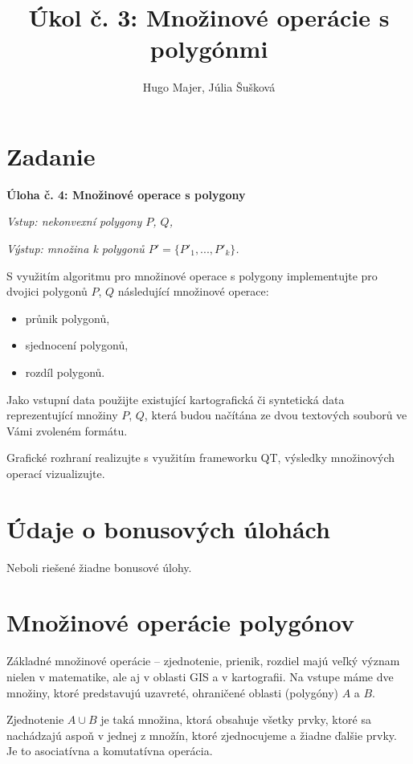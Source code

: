 \documentclass[11pt]{article}
\title{\textbf{Úkol č. 3: Množinové operácie s polygónmi}}
\author{Hugo Majer, Júlia Šušková}
\begin{document}
\maketitle

\newpage
{}
\section{Zadanie}
\textbf{Úloha č. 4: Množinové operace s polygony}

\textit{Vstup: nekonvexní polygony $P$, $Q$,}

\textit{Výstup: množina k polygonů $P'=\{P'_1, ..., P'_k\}$.}

S využitím algoritmu pro množinové operace s polygony implementujte pro dvojici polygonů $P$, $Q$ následující množinové operace:
\begin{itemize}
    \item \parindent průnik polygonů,
    \item \parindent sjednocení polygonů,
    \item \parindent rozdíl polygonů.
\end{itemize}

Jako vstupní data použijte existující kartografická či syntetická data reprezentující množiny $P$, $Q$, která budou
načítána ze dvou textových souborů ve Vámi zvoleném formátu.

Grafické rozhraní realizujte s využitím frameworku QT, výsledky množinových operací vizualizujte.

\section{Údaje o bonusových úlohách}
Neboli riešené žiadne bonusové úlohy.

\setlength{\parindent}{1cm}
\newpage
\section{Množinové operácie polygónov}
Základné množinové operácie -- zjednotenie, prienik, rozdiel majú veľký význam nielen v matematike, ale aj v oblasti GIS a v kartografii. Na vstupe máme dve množiny, ktoré predstavujú uzavreté, ohraničené oblasti (polygóny) $A$ a $B$.

Zjednotenie $A \cup B$ je taká množina, ktorá obsahuje všetky prvky, ktoré sa nachádzajú aspoň v jednej z množín, ktoré zjednocujeme a žiadne ďalšie prvky. Je to asociatívna a komutatívna operácia.
\end{document}
